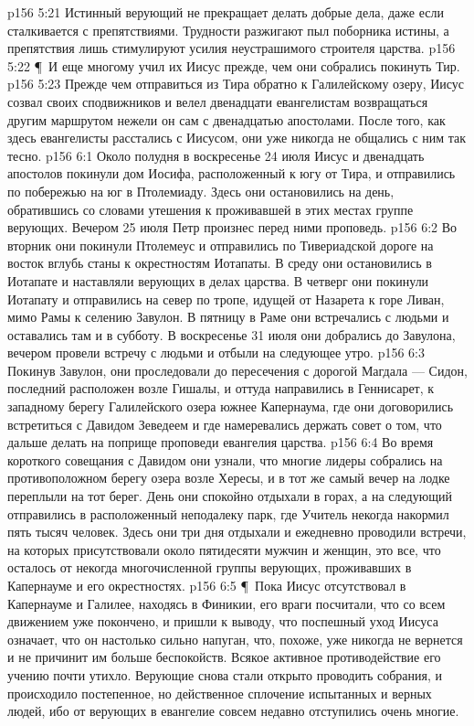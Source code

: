 \vs p156 5:21 Истинный верующий не прекращает делать добрые дела, даже если сталкивается с препятствиями. Трудности разжигают пыл поборника истины, а препятствия лишь стимулируют усилия неустрашимого строителя царства.
\vs p156 5:22 \P\ И еще многому учил их Иисус прежде, чем они собрались покинуть Тир.
\vs p156 5:23 Прежде чем отправиться из Тира обратно к Галилейскому озеру, Иисус созвал своих сподвижников и велел двенадцати евангелистам возвращаться другим маршрутом нежели он сам с двенадцатью апостолами. После того, как здесь евангелисты расстались с Иисусом, они уже никогда не общались с ним так тесно.
\vs p156 6:1 Около полудня в воскресенье 24 июля Иисус и двенадцать апостолов покинули дом Иосифа, расположенный к югу от Тира, и отправились по побережью на юг в Птолемиаду. Здесь они остановились на день, обратившись со словами утешения к проживавшей в этих местах группе верующих. Вечером 25 июля Петр произнес перед ними проповедь.
\vs p156 6:2 Во вторник они покинули Птолемеус и отправились по Тивериадской дороге на восток вглубь станы к окрестностям Иотапаты. В среду они остановились в Иотапате и наставляли верующих в делах царства. В четверг они покинули Иотапату и отправились на север по тропе, идущей от Назарета к горе Ливан, мимо Рамы к селению Завулон. В пятницу в Раме они встречались с людьми и оставались там и в субботу. В воскресенье 31 июля они добрались до Завулона, вечером провели встречу с людьми и отбыли на следующее утро.
\vs p156 6:3 Покинув Завулон, они проследовали до пересечения с дорогой Магдала --- Сидон, последний расположен возле Гишалы, и оттуда направились в Геннисарет, к западному берегу Галилейского озера южнее Капернаума, где они договорились встретиться с Давидом Зеведеем и где намеревались держать совет о том, что дальше делать на поприще проповеди евангелия царства.
\vs p156 6:4 Во время короткого совещания с Давидом они узнали, что многие лидеры собрались на противоположном берегу озера возле Хересы, и в тот же самый вечер на лодке переплыли на тот берег. День они спокойно отдыхали в горах, а на следующий отправились в расположенный неподалеку парк, где Учитель некогда накормил пять тысяч человек. Здесь они три дня отдыхали и ежедневно проводили встречи, на которых присутствовали около пятидесяти мужчин и женщин, это все, что осталось от некогда многочисленной группы верующих, проживавших в Капернауме и его окрестностях.
\vs p156 6:5 \P\ Пока Иисус отсутствовал в Капернауме и Галилее, находясь в Финикии, его враги посчитали, что со всем движением уже покончено, и пришли к выводу, что поспешный уход Иисуса означает, что он настолько сильно напуган, что, похоже, уже никогда не вернется и не причинит им больше беспокойств. Всякое активное противодействие его учению почти утихло. Верующие снова стали открыто проводить собрания, и происходило постепенное, но действенное сплочение испытанных и верных людей, ибо от верующих в евангелие совсем недавно отступились очень многие.
